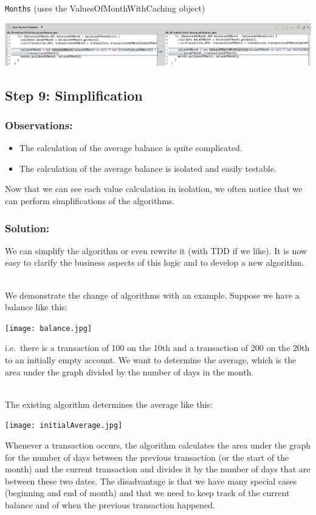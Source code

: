 \documentclass[a4paper,fleqn,titlepage,11pt]{article}
\begin{document}
\texttt{Months} (uses the ValuesOfMonthWithCaching object)

\includegraphics[width=1\textwidth]{CompareViews/09_5-09_6-2.png}


\subsection*{Step 9: Simplification}

\subsubsection*{Observations:}
\begin{itemize}
\item The calculation of the average balance is quite complicated.
\item The calculation of the average balance is isolated and easily testable.
\end{itemize}

Now that we can see each value calculation in isolation, we often notice that we can perform simplifications of the algorithms. 

\subsubsection*{Solution:}

We can simplify the algorithm or even rewrite it (with TDD if we like). It is now easy to clarify the business aspects of this logic and to develop a new algorithm. 
\\~

We demonstrate the change of algorithms with an example.
Suppose we have a balance like this:

\texttt{[image: balance.jpg]}

i.e.~there is a transaction of 100 on the 10th and a transaction of 200 on the 20th to an initially empty account.
We want to determine the average, which is the area under the graph divided by the number of days in the month.
\\~

The existing algorithm determines the average like this:

\texttt{[image: initialAverage.jpg]}

Whenever a transaction occurs, the algorithm calculates the area under the graph for the number of days between the previous transaction (or the start of the month) and the current transaction and divides it by the number of days that are between these two dates. The disadvantage is that we have many special cases (beginning and end of month) and that we need to keep track of the current balance and of when the previous transaction happened.
\\~
\end{document}
